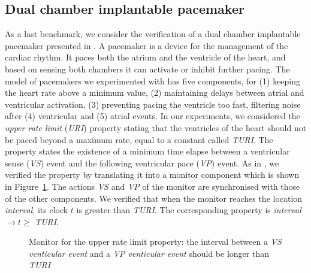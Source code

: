 \documentclass{LMCS}
\newcommand{\mycomment}[1]{}
\theoremstyle{plain}\newtheorem{remark}[thm]{Remark}
\theoremstyle{plain}\newtheorem{example}[thm]{Example}
\begin{document}
\subsection{Dual chamber implantable pacemaker}
As a last benchmark, we consider the verification of a dual chamber
implantable pacemaker presented in \cite{pacemaker}. A pacemaker is a
device for the management of the cardiac rhythm. It paces both the
atrium and the ventricle of the heart, and based on sensing both
chambers it can activate or inhibit further pacing. The model of
pacemakers we experimented with has five components, for (1) keeping
the heart rate above a minimum value, (2) maintaining delays between
atrial and ventricular activation, (3) preventing pacing the ventricle
too fast, filtering noise after (4) ventricular and (5) atrial events.
In our experiments, we considered the \textit{upper rate limit}
(\textit{URI}) property stating that the ventricles of the heart
should not be paced beyond a maximum rate, equal to a constant called
\textit{TURI}. The property states the existence of a minimum time
elapse\mycomment{, equal to a defined \textit{TURI} constant,} between
a ventricular sense (\textit{VS}) event and the following ventricular
pace (\textit{VP}) event. As in \cite{pacemaker}, we verified the
property by translating it into a monitor component which is shown in
Figure~\ref{fig:pacemaker}. The actions \textit{VS} and \textit{VP} of
the monitor are synchronised with those of the other components.
We verified that when the monitor reaches the location \textit{interval},
its clock $t$ is greater than \textit{TURI}. The corresponding property is 
\textit{interval} $\rightarrow t \geq$ \textit{TURI}.
\begin{figure}[htp]
\centering
\scriptsize{
\caption{ Monitor for the upper rate limit property: the interval between a \textit{VS venticular event} and a \textit{VP venticular event} should be longer than \textit{TURI} \label{fig:pacemaker}}}
\end{figure}
\end{document}
